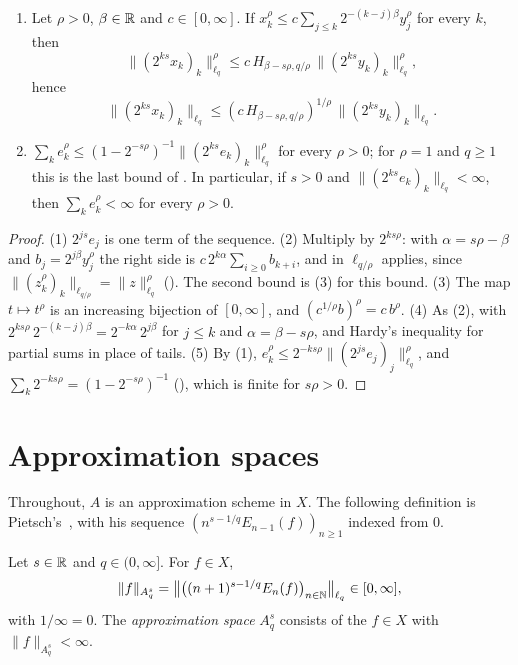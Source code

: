 \begin{lemma}
\begin{enumerate}
    $a \leq 2^{1/p} b$.
  \item Let $\rho > 0$, $\beta \in \mathbb{R}$ and $c \in [0, \infty]$. If
    $x_k^\rho \leq c \sum_{j \leq k} 2^{-(k-j)\beta} y_j^\rho$ for every $k$, then
    \[
      \|(2^{ks} x_k)_k\|_{\ell_q}^\rho \leq c \, H_{\beta - s\rho, q/\rho} \,
      \|(2^{ks} y_k)_k\|_{\ell_q}^\rho ,
    \]
    hence
    \[
      \|(2^{ks} x_k)_k\|_{\ell_q} \leq (c \, H_{\beta - s\rho, q/\rho})^{1/\rho} \,
      \|(2^{ks} y_k)_k\|_{\ell_q} .
    \]
  \item $\sum_k e_k^\rho \leq (1 - 2^{-s\rho})^{-1} \|(2^{ks} e_k)_k\|_{\ell_q}^\rho$ for every
    $\rho > 0$; for $\rho = 1$ and $q \geq 1$ this is the last bound of . In
    particular, if $s > 0$ and $\|(2^{ks} e_k)_k\|_{\ell_q} < \infty$, then
    $\sum_k e_k^\rho < \infty$ for every $\rho > 0$.
\end{enumerate}
\end{lemma}

\begin{proof}
\leanok
{}
(1) $2^{js} e_j$ is one term of the sequence. (2) Multiply by $2^{ks\rho}$: with
$\alpha = s\rho - \beta$ and $b_j = 2^{j\beta} y_j^\rho$ the right side is
$c \, 2^{k\alpha} \sum_{i \geq 0} b_{k+i}$, and  in
$\ell_{q/\rho}$ applies, since $\|(z_k^\rho)_k\|_{\ell_{q/\rho}} = \|z\|_{\ell_q}^\rho$
(). The second bound is (3) for this bound. (3) The map
$t \mapsto t^\rho$ is an increasing bijection of $[0, \infty]$, and
$(c^{1/\rho} b)^\rho = c \, b^\rho$. (4) As (2), with
$2^{ks\rho} \, 2^{-(k-j)\beta} = 2^{-k\alpha} \, 2^{j\beta}$ for $j \leq k$ and
$\alpha = \beta - s\rho$, and Hardy's inequality for partial sums in place of tails. (5) By (1),
$e_k^\rho \leq 2^{-ks\rho} \|(2^{js} e_j)_j\|_{\ell_q}^\rho$, and
$\sum_k 2^{-ks\rho} = (1 - 2^{-s\rho})^{-1}$ (), which is finite for $s\rho > 0$.
\end{proof}

\chapter{Approximation spaces}
\label{ch:approximation-spaces}

Throughout, $A$ is an approximation scheme in $X$. The following definition is
Pietsch's~\cite{Pietsch}, with his sequence $(n^{s-1/q} E_{n-1}(f))_{n \geq 1}$ indexed
from $0$.

\begin{definition}
\label{def:approx-space}
\leanok
{}
Let $s \in \mathbb{R}$ and $q \in (0, \infty]$. For $f \in X$,
\[
  \|f\|_{A^s_q} = \bigl\| \bigl((n+1)^{s - 1/q} E_n(f)\bigr)_{n \in \mathbb{N}} \bigr\|_{\ell_q}
  \in [0, \infty],
\]
with $1/\infty = 0$. The \emph{approximation space} $A^s_q$ consists of the $f \in X$ with
$\|f\|_{A^s_q} < \infty$.
\end{definition}


